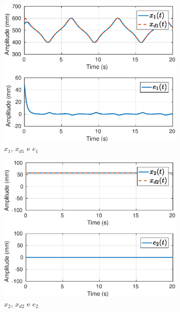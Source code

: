 \begin{figure}[H]
\centering
\begin{subfigure}{.5\textwidth}
  \centering
  \includegraphics[width=\linewidth]{./img/traj_2_k5/x1.eps}
  \caption{$x_1$, $x_{d1}$ e $e_1$}
  \label{fig:sub1}
\end{subfigure}%
\begin{subfigure}{.5\textwidth}
  \centering
  \includegraphics[width=\linewidth]{./img/traj_2_k5/x2.eps}
  \caption{$x_2$, $x_{d2}$ e $e_2$}
  \label{fig:sub2}
\end{subfigure}
\begin{subfigure}{.5\textwidth}

\end{subfigure}
\end{figure}
